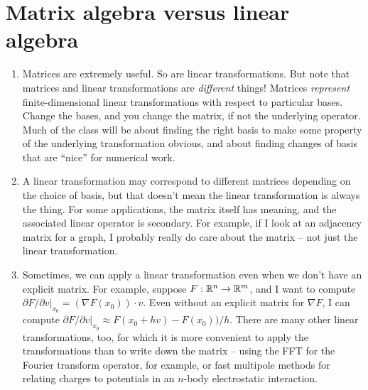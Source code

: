 \documentclass[12pt, leqno]{article}
\begin{document}


\section*{Matrix algebra versus linear algebra}

\begin{enumerate}
\item
  Matrices are extremely useful.  So are linear transformations.  But note
  that matrices and linear transformations are {\em different} things!
  Matrices {\em represent} finite-dimensional linear transformations with
  respect to particular bases.  Change the bases, and you change the
  matrix, if not the underlying operator.  Much of the class will be about
  finding the right basis to make some property of the underlying transformation
  obvious, and about finding changes of basis that are ``nice'' for
  numerical work.

\item
  A linear transformation may correspond to different matrices depending on the
  choice of basis, but that doesn't mean the linear transformation is always the
  thing.  For some applications, the matrix itself has meaning, and the
  associated linear operator is secondary.  For example, if I look at 
  an adjacency matrix for a graph, I probably really do care about the matrix --
  not just the linear transformation.

\item
  Sometimes, we can apply a linear transformation even when we don't have an
  explicit matrix.  For example, suppose $F : \mathbb{R}^n \rightarrow
  \mathbb{R}^m$, and I want to compute 
  $\partial F / \partial v|_{x_0} = (\nabla F(x_0)) \cdot v$.
  Even without an explicit matrix for $\nabla F$, I can compute
  $\partial F / \partial v|_{x_0} \approx F(x_0 + hv)-F(x_0))/h$.
  There are many other linear transformations, too, for which it is
  more convenient to apply the transformations than to write down the
  matrix -- using the FFT for the Fourier transform operator, for
  example, or fast multipole methods for relating charges to potentials
  in an $n$-body electrostatic interaction.

\end{enumerate}
\end{document}
